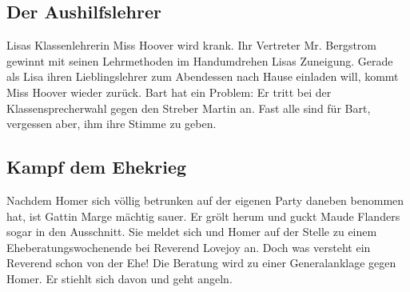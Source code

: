	
\subsection{Der Aushilfslehrer}\label{7F19}
Lisas Klassenlehrerin Miss Hoover wird krank. Ihr Vertreter Mr. Bergstrom gewinnt mit seinen Lehrmethoden im Handumdrehen Lisas Zuneigung. Gerade als Lisa ihren Lieblingslehrer zum Abendessen nach Hause einladen will, kommt Miss Hoover wieder zurück. Bart hat ein Problem: Er tritt bei der Klassensprecherwahl gegen den Streber Martin an. Fast alle sind für Bart, vergessen aber, ihm ihre Stimme zu geben.


	
\subsection{Kampf dem Ehekrieg}\label{7F20}
Nachdem Homer sich völlig betrunken auf der eigenen Party daneben benommen hat, ist Gattin Marge mächtig sauer. Er grölt herum und guckt Maude Flanders sogar in den Ausschnitt. Sie meldet sich und Homer auf der Stelle zu einem Eheberatungswochenende bei Reverend Lovejoy an. Doch was versteht ein Reverend schon von der Ehe! Die Beratung wird zu einer Generalanklage gegen Homer. Er stiehlt sich davon und geht angeln.

